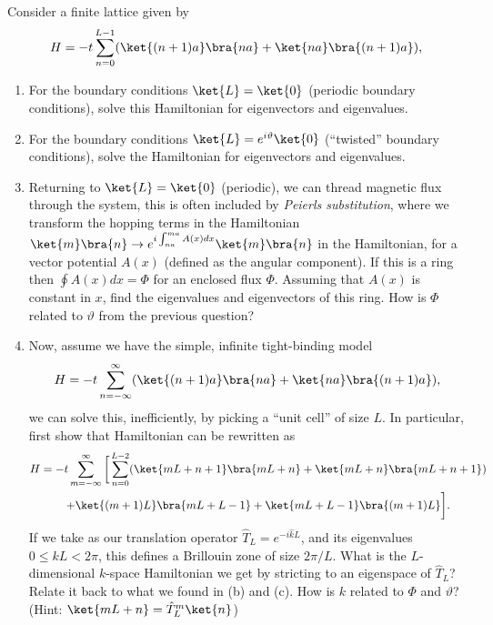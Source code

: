 \documentclass{cthhw}
\begin{document}
Consider a finite lattice given by
\begin{equation}
	\label{eq:5}
	H = -t \sum_{n=0}^{L-1} (\ket{(n+1)a}\bra{na} + \ket{na}\bra{(n+1)a}),
\end{equation}
\begin{enumerate}
	\item For the boundary conditions $\ket{L} = \ket{0}$ (periodic boundary conditions), solve this Hamiltonian for eigenvectors and eigenvalues.
	\item For the boundary conditions $\ket{L} = e^{i\vartheta} \ket{0}$ (``twisted'' boundary conditions), solve the Hamiltonian for eigenvectors and eigenvalues.
	\item Returning to $\ket{L} =\ket{0}$ (periodic), we can thread magnetic flux through the system, this is often included by \emph{Peierls substitution}, where we transform the hopping terms in the Hamiltonian $\ket{m}\bra{n} \rightarrow e^{i \int_{na}^{m a} A(x) dx} \ket{m}\bra{n}$ in the Hamiltonian, for a vector potential $A(x)$ (defined as the angular component). If this is a ring then $\oint A(x) dx = \Phi$ for an enclosed flux $\Phi$. Assuming that $A(x)$ is constant in $x$, find the eigenvalues and eigenvectors of this ring. How is $\Phi$ related to $\vartheta$ from the previous question?
	\item Now, assume we have the simple, infinite tight-binding model
	\begin{equation}
		\label{eq:7}
		H = -t \sum_{n=-\infty}^{\infty} (\ket{(n+1)a}\bra{na} + \ket{na}\bra{(n+1)a}),
	\end{equation}
	we can solve this, inefficiently, by picking a ``unit cell'' of size $L$. In particular, first show that Hamiltonian can be rewritten as
	\begin{multline}
		\label{eq:8}
		H = -t \sum_{m=-\infty}^{\infty}\bigg[ \sum_{n=0}^{L-2}( \ket{m L + n + 1}\bra{m L + n} + \ket{mL + n}\bra{mL + n + 1} ) \\ + \ket{(m+1)L}\bra{mL + L-1} + \ket{mL + L-1} \bra{(m+1)L}\bigg].
	\end{multline}
	If we take as our translation operator $\hat T_{L} = e^{-i \hat k L}$, and its eigenvalues $0 \leq kL < 2\pi$, this defines a Brillouin zone of size $2\pi/L$. What is the $L$-dimensional $k$-space Hamiltonian we get by stricting to an eigenspace of $\hat T_{L}$? Relate it back to what we found in (b) and (c). How is $k$ related to $\Phi$ and $\vartheta$? (Hint: $\ket{mL + n} = \hat T_{L}^{m} \ket{n}$)
\end{enumerate}
\end{document}
